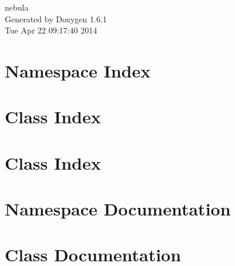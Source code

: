 \documentclass[a4paper]{book}
\begin{document}
\hypersetup{pageanchor=false}
\begin{titlepage}
\vspace*{7cm}
\begin{center}
{\Large nebula }\\
\vspace*{1cm}
{\large Generated by Doxygen 1.6.1}\\
\vspace*{0.5cm}
{\small Tue Apr 22 09:17:40 2014}\\
\end{center}
\end{titlepage}
\clearemptydoublepage
{}
\tableofcontents
\clearemptydoublepage
{}
\hypersetup{pageanchor=true}
\chapter{Namespace Index}

\chapter{Class Index}

\chapter{Class Index}

\chapter{Namespace Documentation}







\chapter{Class Documentation}






























\printindex
\end{document}
